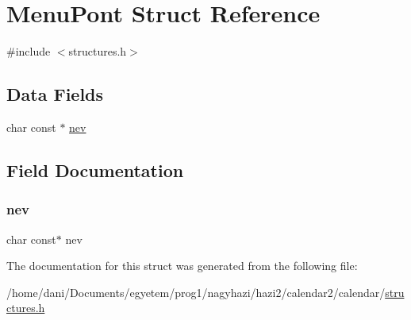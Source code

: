 \hypertarget{struct_menu_pont}{}\section{Menu\+Pont Struct Reference}
\label{struct_menu_pont}


{\ttfamily \#include $<$structures.\+h$>$}

\subsection*{Data Fields}
\begin{DoxyCompactItemize}
\item 
char const  $\ast$ \hyperlink{struct_menu_pont_a21c8b004e3b92cd18b29f8a51717956d}{nev}
\end{DoxyCompactItemize}


\subsection{Field Documentation}
\mbox{\label{struct_menu_pont_a21c8b004e3b92cd18b29f8a51717956d}} 
\subsubsection{\texorpdfstring{nev}{nev}}
{\footnotesize\ttfamily char const$\ast$ nev}



The documentation for this struct was generated from the following file\+:\begin{DoxyCompactItemize}
\item 
/home/dani/\+Documents/egyetem/prog1/nagyhazi/hazi2/calendar2/calendar/\hyperlink{structures_8h}{structures.\+h}\end{DoxyCompactItemize}
